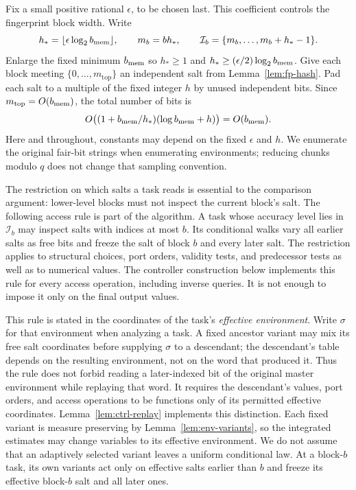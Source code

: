 \documentclass[11pt]{article}
\numberwithin{equation}{section}
\theoremstyle{definition}
\theoremstyle{remark}
\begin{document}
Fix a small positive rational $\epsilon$, to be chosen last.
This coefficient controls the fingerprint block width. Write
\begin{equation}
 h_*=\lfloor\epsilon\log_2 {b_{\rm mem}}\rfloor,\qquad
 {m}_b=bh_*,\qquad
 \mathcal I_b=\{{m}_b,\ldots,{m}_b+h_*-1\}.
 \label{eq:fp-blocks}
\end{equation}
Enlarge the fixed minimum ${b_{\rm mem}}$ so $h_*\ge1$ and
$h_*\ge(\epsilon/2)\log_2{b_{\rm mem}}$.  Give each block meeting
$\{0,\ldots,{m}_{\mathrm{top}}\}$ an independent salt from
Lemma~\ref{lem:fp-hash}.  Pad each salt to a multiple of the fixed integer
${h}$ by unused independent bits.  Since ${m}_{\mathrm{top}}=O({b_{\rm mem}})$, the total
number of bits is
\begin{equation}
 O\bigl((1+{b_{\rm mem}}/h_*)(\log {b_{\rm mem}}+{h})\bigr)=O({b_{\rm mem}}).
 \label{eq:fp-salt-space}
\end{equation}
Here and throughout, constants may depend on the fixed $\epsilon$ and ${h}$.
We enumerate the original fair-bit strings when enumerating environments;
reducing chunks modulo $q$ does not change that sampling convention.

The restriction on which salts a task reads is essential to the comparison argument: lower-level blocks must not inspect the current block's salt. The following access rule is part of the algorithm.  A task whose accuracy level
lies in $\mathcal I_b$ may inspect salts with indices at most $b$.  Its
conditional walks vary all earlier salts as free bits and freeze the salt
of block $b$ and every later salt.  The restriction applies to structural
choices, port orders, validity tests, and predecessor tests as well as to
numerical values.  The controller construction below implements this rule
for every access operation, including inverse queries.  It is not enough
to impose it only on the final output values.

This rule is stated in the coordinates of the task's \emph{effective
environment}.  Write $\sigma$ for that environment when analyzing a
task.  A fixed ancestor variant may mix its free salt coordinates before
supplying $\sigma$ to a descendant; the descendant's table depends on
the resulting environment, not on the word that produced it.  Thus the
rule does not forbid reading a later-indexed bit of the original master
environment while replaying that word.  It requires the descendant's
values, port orders, and access operations to be functions only of
its permitted effective coordinates.  Lemma~\ref{lem:ctrl-replay}
implements this distinction.  Each fixed variant is measure preserving
by Lemma~\ref{lem:env-variants}, so the integrated estimates may change
variables to its effective environment.  We do not assume that an
adaptively selected variant leaves a uniform conditional law.  At a
block-$b$ task, its own variants act only on effective salts earlier
than $b$ and freeze its effective block-$b$ salt and all later ones.
\end{document}
